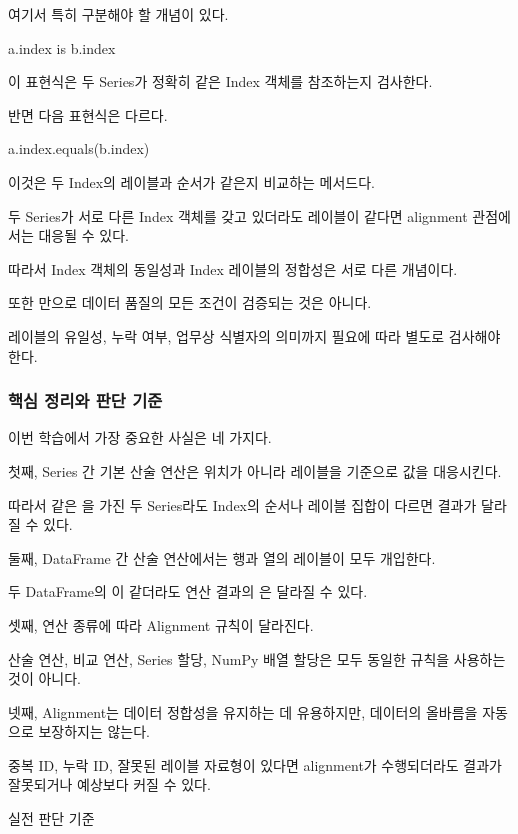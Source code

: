 여기서 특히 구분해야 할 개념이 있다.

\begin{dhkcode}
a.index is b.index
\end{dhkcode}

이 표현식은 두 Series가 정확히 같은 Index 객체를 참조하는지 검사한다.

반면 다음 표현식은 다르다.

\begin{dhkcode}
a.index.equals(b.index)
\end{dhkcode}

이것은 두 Index의 레이블과 순서가 같은지 비교하는 메서드다.

두 Series가 서로 다른 Index 객체를 갖고 있더라도 레이블이 같다면 alignment 관점에서는 대응될 수 있다.

따라서 Index 객체의 동일성과 Index 레이블의 정합성은 서로 다른 개념이다.

또한  만으로 데이터 품질의 모든 조건이 검증되는 것은 아니다.

레이블의 유일성, 누락 여부, 업무상 식별자의 의미까지 필요에 따라 별도로 검사해야 한다.

\subsubsection{핵심 정리와 판단 기준}

이번 학습에서 가장 중요한 사실은 네 가지다.

첫째, Series 간 기본 산술 연산은 위치가 아니라 레이블을 기준으로 값을 대응시킨다.

따라서 같은 을 가진 두 Series라도 Index의 순서나 레이블 집합이 다르면 결과가 달라질 수 있다.

둘째, DataFrame 간 산술 연산에서는 행과 열의 레이블이 모두 개입한다.

두 DataFrame의 이 같더라도 연산 결과의 은 달라질 수 있다.

셋째, 연산 종류에 따라 Alignment 규칙이 달라진다.

산술 연산, 비교 연산, Series 할당, NumPy 배열 할당은 모두 동일한 규칙을 사용하는 것이 아니다.

넷째, Alignment는 데이터 정합성을 유지하는 데 유용하지만, 데이터의 올바름을 자동으로 보장하지는 않는다.

중복 ID, 누락 ID, 잘못된 레이블 자료형이 있다면 alignment가 수행되더라도 결과가 잘못되거나 예상보다 커질 수 있다.

\begin{dhknote}
\begin{dhksmry}[centered]
실전 판단 기준
\end{dhksmry}
\end{dhknote}


